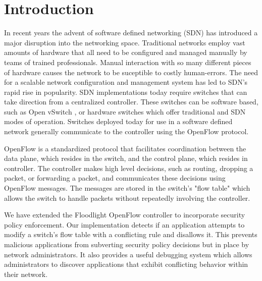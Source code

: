 \section{Introduction}
\label{sec:intro}

In recent years the advent of software defined networking (SDN) has introduced a major disruption into the networking space.
Traditional networks employ vast amounts of hardware that all need to be configured and managed manually by teams of trained professionals.
Manual interaction with so many different pieces of hardware causes the network to be suceptible to costly human-errors. 
The need for a scalable network configuration and management system has led to SDN's rapid rise in popularity.
SDN implementations today require switches that can take direction from a centralized controller.
These switches can be software based, such as Open vSwitch \cite{DBLP:conf/hotnets/PfaffPACKS09}, or hardware switches which offer traditional and SDN modes of operation.
Switches deployed today for use in a software defined network generally communicate to the controller using the OpenFlow protocol.

OpenFlow \cite{openflow} is a standardized protocol that facilitates coordination between the data plane, which resides in the switch, and the control plane, which resides in controller.
The controller makes high level decisions, such as routing, dropping a packet, or forwarding a packet, and communicates these decisions using OpenFlow messages.
The messages are stored in the switch's "flow table" which allows the switch to handle packets without repeatedly involving the controller. 


We have extended the Floodlight OpenFlow controller \cite{floodlight} to incorporate security policy enforcement.
Our implementation detects if an application attempts to modify a switch's flow table with a conflicting rule and disallows it.
This prevents malicious applications from subverting security policy decisions but in place by network administrators.
It also provides a useful debugging system which allows administrators to discover applications that exhibit conflicting behavior within their network.

